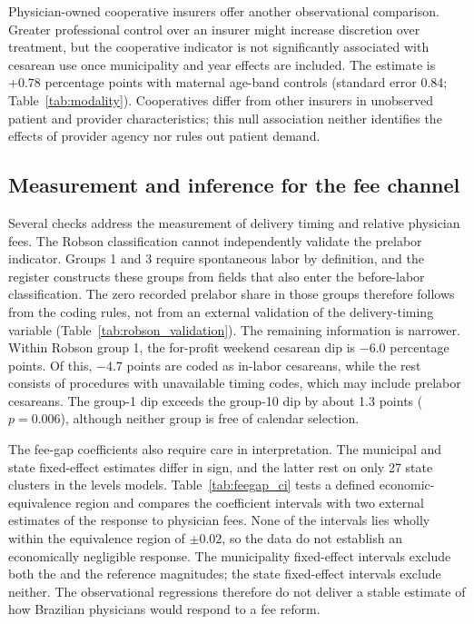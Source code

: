 Physician-owned cooperative insurers offer another observational comparison.
Greater professional control over an insurer might increase discretion over
treatment, but the cooperative indicator is not significantly associated with
cesarean use once municipality and year effects are included. The estimate is
$+0.78$ percentage points with maternal age-band controls (standard error 0.84;
Table~\ref{tab:modality}). Cooperatives differ from other insurers in unobserved
patient and provider characteristics; this null association neither identifies the
effects of provider agency nor rules out patient demand.




\subsection{Measurement and inference for the fee channel}

Several checks address the measurement of delivery timing and relative physician
fees. The Robson classification cannot independently validate the prelabor
indicator. Groups 1 and 3 require spontaneous labor by definition, and the register
constructs these groups from fields that also enter the before-labor
classification. The zero recorded prelabor share in those groups therefore follows
from the coding rules, not from an external validation of the delivery-timing
variable (Table~\ref{tab:robson_validation}). The remaining information is
narrower. Within Robson group 1, the for-profit weekend cesarean dip is $-6.0$
percentage points. Of this, $-4.7$ points are coded as in-labor cesareans, while
the rest consists of procedures with unavailable timing codes, which may include
prelabor cesareans. The group-1 dip exceeds the group-10 dip by about 1.3 points
($p = 0.006$), although neither group is free of calendar selection.



The fee-gap coefficients also require care in interpretation. The municipal and
state fixed-effect estimates differ in sign, and the latter rest on only 27 state
clusters in the levels models. Table~\ref{tab:feegap_ci} tests a defined
economic-equivalence region and compares the coefficient intervals with two
external estimates of the response to physician fees. None of the intervals lies
wholly within the equivalence region of $\pm 0.02$, so the data do not establish an
economically negligible response. The municipality fixed-effect intervals exclude
both the \citet{grant2009} and the \citet{gruber1999physician} reference
magnitudes; the state fixed-effect intervals exclude neither. The observational
regressions therefore do not deliver a stable estimate of how Brazilian physicians
would respond to a fee reform.

